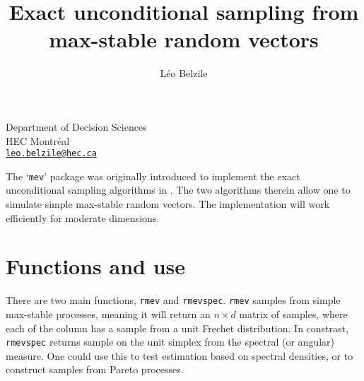 \documentclass{article}\usepackage[]{graphicx}\usepackage[]{color}
\newcommand{\code}[1]{\texttt{#1}}
\begin{document}

\title{Exact unconditional sampling from max-stable random vectors}
\author{Léo Belzile}
\date{}
\maketitle
\begin{center}
{ \small
Department of Decision Sciences \\ HEC Montréal  \\\href{leo.belzile@hec.ca}{\texttt{leo.belzile@hec.ca}}
}
\end{center}

The `\code{mev}' package was originally introduced to implement the exact unconditional sampling algorithms in \cite{Dombry:2016}. The two algorithms therein allow one to simulate simple max-stable random vectors. The implementation will work efficiently for moderate dimensions.

\section{Functions and use}

There are two main functions, \code{rmev} and \code{rmevspec}. \code{rmev} samples from simple max-stable processes, meaning it will return an $n \times d$ matrix of samples, where each of the column has a sample from a unit Frechet distribution. In constrast, \code{rmevspec} returns sample on the unit simplex from the spectral (or angular) measure. One could use this to test estimation based on spectral densities, or to construct samples from Pareto processes.
\end{document}
